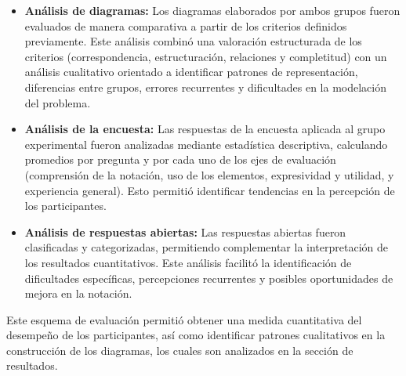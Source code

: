 \begin{itemize}
\item \textbf{Análisis de diagramas:} Los diagramas elaborados por ambos grupos fueron evaluados de manera comparativa a partir de los criterios definidos previamente. Este análisis combinó una valoración estructurada de los criterios (correspondencia, estructuración, relaciones y completitud) con un análisis cualitativo orientado a identificar patrones de representación, diferencias entre grupos, errores recurrentes y dificultades en la modelación del problema.

\item \textbf{Análisis de la encuesta:} Las respuestas de la encuesta aplicada al grupo experimental fueron analizadas mediante estadística descriptiva, calculando promedios por pregunta y por cada uno de los ejes de evaluación (comprensión de la notación, uso de los elementos, expresividad y utilidad, y experiencia general). Esto permitió identificar tendencias en la percepción de los participantes.

\item \textbf{Análisis de respuestas abiertas:} Las respuestas abiertas fueron clasificadas y categorizadas, permitiendo complementar la interpretación de los resultados cuantitativos. Este análisis facilitó la identificación de dificultades específicas, percepciones recurrentes y posibles oportunidades de mejora en la notación.

\end{itemize}

\noindent
Este esquema de evaluación permitió obtener una medida cuantitativa del desempeño de los participantes, así como identificar patrones cualitativos en la construcción de los diagramas, los cuales son analizados en la sección de resultados.